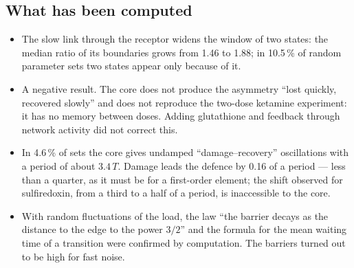 \subsection{What has been computed}
\begin{itemize}
\item The slow link through the receptor widens the window of two states: the median ratio of its boundaries grows from 1.46 to 1.88; in 10.5\,\% of random parameter sets two states appear only because of it.\tD
\item A negative result. The core does not produce the asymmetry ``lost quickly, recovered slowly'' and does not reproduce the two-dose ketamine experiment: it has no memory between doses. Adding glutathione and feedback through network activity did not correct this.\tD
\item In 4.6\,\% of sets the core gives undamped ``damage--recovery'' oscillations with a period of about $3.4\,T$. Damage leads the defence by 0.16 of a period --- less than a quarter, as it must be for a first-order element; the shift observed for sulfiredoxin, from a third to a half of a period, is inaccessible to the core.\tD
\item With random fluctuations of the load, the law ``the barrier decays as the distance to the edge to the power $3/2$'' and the formula for the mean waiting time of a transition were confirmed by computation. The barriers turned out to be high for fast noise.\tD
\end{itemize}
